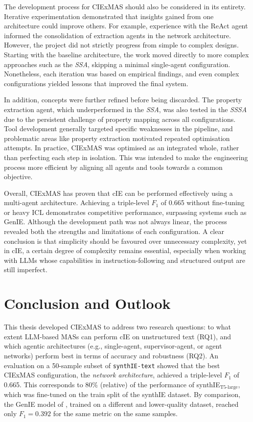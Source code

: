 \documentclass[a4paper,oneside,bibliography=totoc]{scrbook}
\begin{document}
The development process for CIExMAS should also be considered in its entirety. Iterative experimentation demonstrated that insights gained from one architecture could improve others. For example, experience with the ReAct agent informed the consolidation of extraction agents in the network architecture. However, the project did not strictly progress from simple to complex designs. Starting with the baseline architecture, the work moved directly to more complex approaches such as the \textit{\ac{SSA}}, skipping a minimal single-agent configuration. Nonetheless, each iteration was based on empirical findings, and even complex configurations yielded lessons that improved the final system.

In addition, concepts were further refined before being discarded. The property extraction agent, which underperformed in the \textit{\ac{SSA}}, was also tested in the \textit{\ac{SSSA}} due to the persistent challenge of property mapping across all configurations. Tool development generally targeted specific weaknesses in the pipeline, and problematic areas like property extraction motivated repeated optimisation attempts. In practice, CIExMAS was optimised as an integrated whole, rather than perfecting each step in isolation. This was intended to make the engineering process more efficient by aligning all agents and tools towards a common objective.

Overall, CIExMAS has proven that \ac{cIE} can be performed effectively using a multi-agent architecture. Achieving a triple-level $F_{1}$ of 0.665 without fine-tuning or heavy \ac{ICL} demonstrates competitive performance, surpassing systems such as GenIE. Although the development path was not always linear, the process revealed both the strengths and limitations of each configuration. A clear conclusion is that simplicity should be favoured over unnecessary complexity, yet in \ac{cIE}, a certain degree of complexity remains essential, especially when working with \acp{LLM} whose capabilities in instruction-following and structured output are still imperfect.

\chapter{Conclusion and Outlook}
\label{ch:conclusion_outlook}

This thesis developed CIExMAS to address two research questions: to what extent \ac{LLM}-based \acp{MAS} can perform \ac{cIE} on unstructured text (RQ1), and which agentic architectures (e.g., single-agent, supervisor-agent, or agent networks) perform best in terms of accuracy and robustness (RQ2). An evaluation on a 50-sample subset of \texttt{synthIE-text} showed that the best CIExMAS configuration, the \textit{network architecture}, achieved a triple-level $F_{1}$ of 0.665. This corresponds to 80\% (relative) of the performance of synthIE$_{\text{T5-large}}$, which was fine-tuned on the train split of the synthIE dataset. By comparison, the GenIE model of \citet{Josifoski2021}, trained on a different and lower-quality dataset, reached only $F_{1}=0.392$ for the same metric on the same samples.
\end{document}
